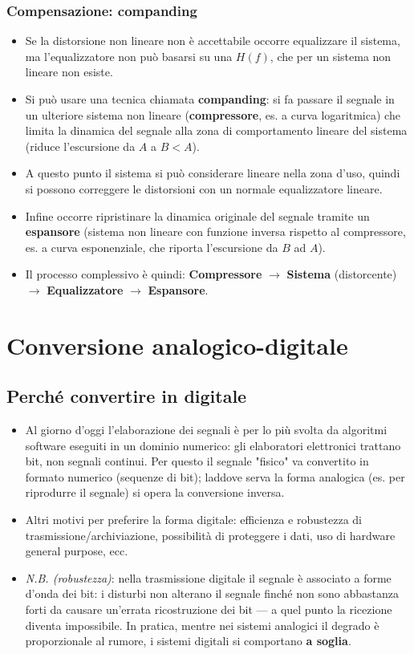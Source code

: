 \documentclass[12pt, a4paper]{article}
\begin{document}
\subsubsection{Compensazione: companding}
\begin{itemize}
    \item Se la distorsione non lineare non è accettabile occorre equalizzare il sistema, ma l'equalizzatore non può basarsi su una $H(f)$, che per un sistema non lineare non esiste.
    \item Si può usare una tecnica chiamata \textbf{companding}: si fa passare il segnale in un ulteriore sistema non lineare (\textbf{compressore}, es. a curva logaritmica) che limita la dinamica del segnale alla zona di comportamento lineare del sistema (riduce l'escursione da $A$ a $B<A$).
    \item A questo punto il sistema si può considerare lineare nella zona d'uso, quindi si possono correggere le distorsioni con un normale equalizzatore lineare.
    \item Infine occorre ripristinare la dinamica originale del segnale tramite un \textbf{espansore} (sistema non lineare con funzione inversa rispetto al compressore, es. a curva esponenziale, che riporta l'escursione da $B$ ad $A$).
    \item Il processo complessivo è quindi: \textbf{Compressore} $\to$ \textbf{Sistema} (distorcente) $\to$ \textbf{Equalizzatore} $\to$ \textbf{Espansore}.
\end{itemize}



\section{Conversione analogico-digitale}

\subsection{Perché convertire in digitale}
\begin{itemize}
    \item Al giorno d'oggi l'elaborazione dei segnali è per lo più svolta da algoritmi software eseguiti in un dominio numerico: gli elaboratori elettronici trattano bit, non segnali continui. Per questo il segnale "fisico" va convertito in formato numerico (sequenze di bit); laddove serva la forma analogica (es. per riprodurre il segnale) si opera la conversione inversa.
    \item Altri motivi per preferire la forma digitale: efficienza e robustezza di trasmissione/archiviazione, possibilità di proteggere i dati, uso di hardware general purpose, ecc.
    \item[] \textit{N.B. (robustezza)}: nella trasmissione digitale il segnale è associato a forme d'onda dei bit: i disturbi non alterano il segnale finché non sono abbastanza forti da causare un'errata ricostruzione dei bit — a quel punto la ricezione diventa impossibile. In pratica, mentre nei sistemi analogici il degrado è proporzionale al rumore, i sistemi digitali si comportano \textbf{a soglia}.
\end{itemize}
\end{document}
